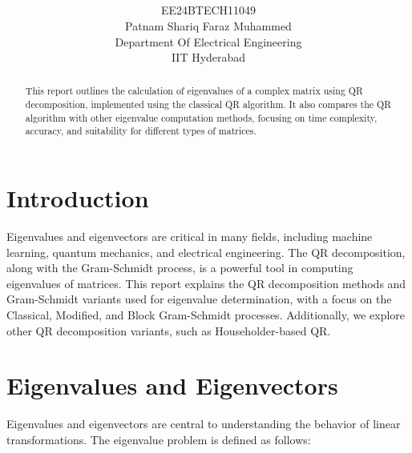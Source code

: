 \documentclass[article]{IEEEtran}
\numberwithin{equation}{enumi}
\numberwithin{figure}{enumi}
\begin{document}

\title{\textcolor{blue}{} \\ \scalebox{0.75}{Eigenvalue Determination in Complex Matrices} \\ \scalebox{0.75}{through the QR Iterative Method}}
\author{EE24BTECH11049 \\ Patnam Shariq Faraz Muhammed \\ Department Of Electrical Engineering \\ IIT Hyderabad}

{\let\newpage\relax\maketitle}

\begin{abstract}
	This report outlines the calculation of eigenvalues of a complex matrix using QR decomposition, implemented using the classical QR algorithm. It also compares the QR algorithm with other eigenvalue computation methods, focusing on time complexity, accuracy, and suitability for different types of matrices.
\end{abstract}

\section{Introduction}
Eigenvalues and eigenvectors are critical in many fields, including machine learning, quantum mechanics, and electrical engineering. The QR decomposition, along with the Gram-Schmidt process, is a powerful tool in computing eigenvalues of matrices. This report explains the QR decomposition methods and Gram-Schmidt variants used for eigenvalue determination, with a focus on the Classical, Modified, and Block Gram-Schmidt processes. Additionally, we explore other QR decomposition variants, such as Householder-based QR.

\section{Eigenvalues and Eigenvectors}

Eigenvalues and eigenvectors are central to understanding the behavior of linear transformations. The eigenvalue problem is defined as follows:
\end{document}
